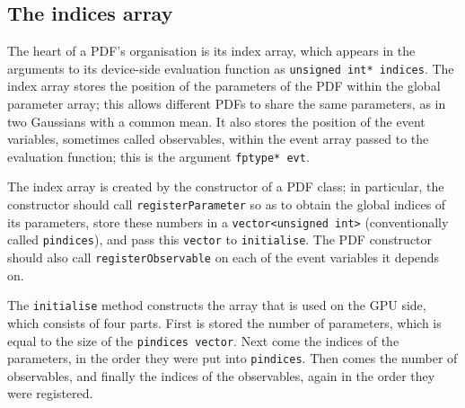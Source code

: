 \documentclass[12pt,pdflatex]{article}
\begin{document}
\subsection{The indices array}
\label{subsec:indexarray}

The heart of a PDF's organisation is its index array, which 
appears in the arguments to its device-side evaluation function
as \verb|unsigned int* indices|. The index array stores the position
of the parameters of the PDF within the global parameter array;
this allows different PDFs to share the same parameters, as in two
Gaussians with a common mean. It also stores the position of the
event variables, sometimes called observables, within the event array
passed to the evaluation function; this is the argument \verb|fptype* evt|.

The index array is created by the constructor of a PDF class; in particular, 
the constructor should call \verb|registerParameter| 
so as to obtain the global indices of its parameters, store these
numbers in a \verb|vector<unsigned int>| (conventionally called \verb|pindices|),
and pass this \verb|vector| to \verb|initialise|. The PDF constructor should
also call \verb|registerObservable| on each of the event variables it depends
on. 

The \verb|initialise| method constructs the array that is used on the GPU side,
which consists of four parts. First is stored the number of parameters,
which is equal to the size of the \verb|pindices vector|. Next come the indices
of the parameters, in the order they were put into \verb|pindices|. Then comes
the number of observables, and finally the indices of the observables, again
in the order they were registered. 
\end{document}
